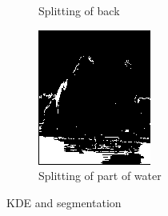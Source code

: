\documentclass{beamer}
\begin{document}
\begin{frame}
\begin{figure}[htb]
\begin{subfigure}[b]{0.24\linewidth}
      \caption{Splitting of back}
    \end{subfigure}
    \begin{subfigure}[b]{0.24\linewidth}
      \includegraphics[width=\linewidth]{images/toad_split_water.png}
      \caption{Splitting of part of water}
    \end{subfigure}
    \caption{KDE and segmentation}
    \label{fig:splitting}
  \end{figure}

\end{frame}
\end{document}
